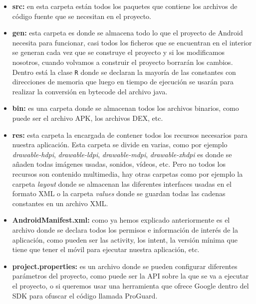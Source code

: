 \begin{itemize}

\item \textbf{src:} en esta carpeta están todos los paquetes que contiene los archivos de código fuente que se necesitan en el proyecto.

\item \textbf{gen:} esta carpeta es donde se almacena todo lo que el proyecto de Android necesita para funcionar, casi todos los ficheros que se encuentran en el interior se generan cada vez que se construye el proyecto y si los modificamos nosotros, cuando volvamos a construir el proyecto borrarán los cambios. Dentro está la clase \lstinline{R} donde se declaran la mayoría de las constantes con direcciones de memoria que luego en tiempo de ejecución se usarán para realizar la conversión en bytecode del archivo java.

\item \textbf{bin:} es una carpeta donde se almacenan todos los archivos binarios, como puede ser el archivo APK, los archivos DEX, etc.

\item \textbf{res:} esta carpeta la encargada de contener todos los recursos necesarios para nuestra aplicación. Esta carpeta se divide en varias, como por ejemplo \textit{drawable-hdpi}, \textit{drawable-ldpi}, \textit{drawable-mdpi}, \textit{drawable-xhdpi} es donde se añaden todas imágenes usadas, sonidos, vídeos, etc. Pero no todos los recursos son contenido multimedia, hay otras carpetas como por ejemplo la carpeta \textit{layout} donde se almacenan las diferentes interfaces usadas en el formato XML o la carpeta \textit{values} donde se guardan todas las cadenas constantes en un archivo XML.

\item \textbf{AndroidManifest.xml:} como ya hemos explicado anteriormente es el archivo donde se declara todos los permisos e información de interés de la aplicación, como pueden ser las activity, los intent, la versión mínima que tiene que tener el móvil para ejecutar nuestra aplicación, etc.  

\item \textbf{project.properties:} es un archivo donde se pueden configurar diferentes parámetros del proyecto, como puede ser la API sobre la que se va a ejecutar el proyecto, o si queremos usar una herramienta que ofrece Google dentro del SDK para ofuscar el código llamada ProGuard.


\end{itemize}
